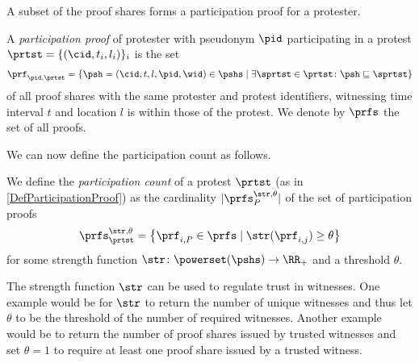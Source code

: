 A subset of the proof shares forms a participation proof for a protester.

\NewVariable{\prf}{\pi}
\NewVariable{\prfs}{\Pi}

\begin{definition}%
  \label{DefParticipationProof}
  A \emph{participation proof} of protester with pseudonym \(\pid\) 
  participating in a protest \(\prtst = \{ (\cid, t_i, l_i) \}_i\) is the set
  \begin{multline}
    \nonumber
    \prf_{\pid, \prtst} =
    \left\{ \psh = (\cid, t, l, \pid, \wid)\in \pshs \mid
      \exists \sprtst\in \prtst\colon \psh\sqsubseteq \sprtst \right\}
  \end{multline}
  of all proof shares with the same protester and protest identifiers, 
  witnessing time interval \(t\) and location \(l\) is within those of the 
  protest.
  We denote by \(\prfs\) the set of all proofs.
\end{definition}

\NewFunction{\str}{\varsigma}

We can now define the participation count as follows.
\begin{definition}%
  \label{DefParticipationCount}
  We define the \emph{participation count} of a protest \(\prtst\) (as in 
  \cref{DefParticipationProof}) as the cardinality \(|\prfs_{P}^{\str,\theta}|\) 
  of the set of participation proofs \[
    \prfs_{\prtst}^{\str,\theta} = \left\{ \prf_{i,P} \in \prfs \mid
      \str(\prf_{i,j})\geq \theta \right\}
  \] for some strength function \(\str\colon \powerset(\pshs)\to \RR_+\) and a 
  threshold \(\theta\).
\end{definition}
The strength function \(\str\) can be used to regulate trust in witnesses.
One example would be for \(\str\) to return the number of unique witnesses and 
thus let \(\theta\) to be the threshold of the number of required witnesses.
Another example would be to return the number of proof shares issued by trusted 
witnesses and set \(\theta = 1\) to require at least one proof share issued by a 
trusted witness.





